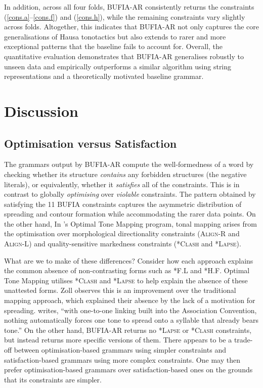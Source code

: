 In addition, across all four folds, BUFIA-AR consistently 
returns the constraints (\ref{cons.a}–\ref{cons.f}) and (\ref{cons.h}), 
while the remaining constraints vary slightly across folds.
Altogether, this indicates that BUFIA-AR not only captures the core
generalisations of Hausa tonotactics but also extends to rarer and
more exceptional patterns that the baseline fails to account
for. Overall, the quantitative evaluation demonstrates that BUFIA-AR
generalises robustly to unseen data and empirically outperforms
a similar algorithm using string representations
and a theoretically motivated baseline grammar.


\section{Discussion}
\label{sec:discussion}

\subsection{Optimisation versus Satisfaction}
\label{sec:discussion.ot}
The grammars output by BUFIA-AR compute the well-formedness of a word
by checking whether its structure \textit{contains} any forbidden
structures (the negative literals), or equivalently, whether it
\textit{satisfies} all of the constraints. This is in contrast to
globally \textit{optimising} over \textit{violable} constraints.  The
pattern obtained by satisfying the 11 BUFIA constraints captures the
asymmetric distribution of spreading and contour formation while
accommodating the rarer data points. On the other hand, In
\citet{zoll2003optimal}’s Optimal Tone Mapping program, tonal mapping
arises from the optimisation over morphological directionality
constraints (\textsc{Align-R} and \textsc{Align-L}) and
quality-sensitive markedness constraints (\textsc{*Clash} and
\textsc{*Lapse}).

What are we to make of these differences? Consider how each approach explains the
common absence of non-contrasting forms such as
\textsc{*F.L} and \textsc{*H.F}.   Optimal Tone Mapping utilises
\textsc{*Clash} and \textsc{*Lapse} to help explain the absence of these unattested 
forms. Zoll observes this is an improvement over the traditional mapping approach, 
which explained their absence by the lack of a motivation for spreading. 
\citet{zoll2003optimal} writes, ``with one-to-one linking built into the Association 
Convention, nothing automatically forces one tone to
spread onto a syllable that already bears tone.''
On the other hand, BUFIA-AR returns no \textsc{*Lapse} or \textsc{*Clash} 
constraints, but instead returns more specific versions of them. 
There appears to be a trade-off between optimisation-based grammars using simpler 
constraints and satisfaction-based grammars using more complex constraints. 
One may then prefer optimisation-based grammars over satisfaction-based ones on the 
grounds that its constraints are simpler.

